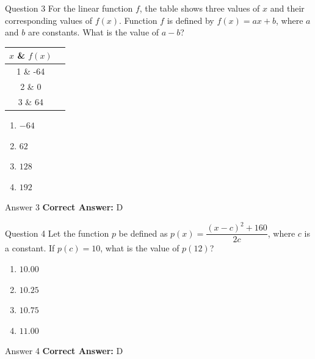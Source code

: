 \documentclass{beamer}
\begin{document}
\begin{frame}{Question 3}
\small
For the linear function \( f \), the table shows three values of \( x \) and their corresponding values of \( f(x) \). Function \( f \) is defined by \( f(x) = ax + b \), where \( a \) and \( b \) are constants. What is the value of \( a - b \)?

\begin{center}
\begin{tabular}{|c|c|}
\hline
\(\displaystyle x\) \& \(\displaystyle f(x)\) \\
\hline
1 \& -64 \\
\hline
2 \& 0 \\
\hline
3 \& 64 \\
\hline
\end{tabular}
\end{center}
\vspace{0.35cm}
\begin{enumerate}
    \item[A.] \(\displaystyle -64\)
    \item[B.] \(\displaystyle 62\)
    \item[C.] \(\displaystyle 128\)
    \item[D.] \(\displaystyle 192\)
\end{enumerate}

\end{frame}
\begin{frame}{Answer 3}
\small
\textbf{Correct Answer:} D
\end{frame}

\begin{frame}{Question 4}
\small
Let the function \(\displaystyle p\) be defined as \(\displaystyle p(x) = \dfrac{(x - c)^2 + 160}{2c}\), where \(\displaystyle c\) is a constant. If \(\displaystyle p(c) = 10\), what is the value of \(\displaystyle p(12)\)?
\vspace{0.35cm}
\begin{enumerate}
    \item[A.] \(\displaystyle 10.00\)
    \item[B.] \(\displaystyle 10.25\)
    \item[C.] \(\displaystyle 10.75\)
    \item[D.] \(\displaystyle 11.00\)
\end{enumerate}

\end{frame}
\begin{frame}{Answer 4}
\small
\textbf{Correct Answer:} D
\end{frame}
\end{document}
